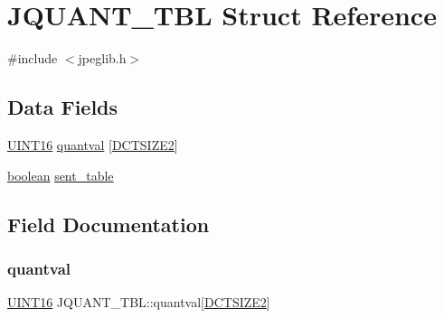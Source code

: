 \hypertarget{struct_j_q_u_a_n_t___t_b_l}{}\section{J\+Q\+U\+A\+N\+T\+\_\+\+T\+BL Struct Reference}
\label{struct_j_q_u_a_n_t___t_b_l}


{\ttfamily \#include $<$jpeglib.\+h$>$}

\subsection*{Data Fields}
\begin{DoxyCompactItemize}
\item 
\hyperlink{jmorecfg_8h_a805c2c164bdd38d72a30c46e84fb568b}{U\+I\+N\+T16} \hyperlink{struct_j_q_u_a_n_t___t_b_l_ab5b5150e73282a62ca7dc0f7e2fac944}{quantval} \mbox{[}\hyperlink{jpeglib_8h_af89dff4200396563157d4a1e59da3bdf}{D\+C\+T\+S\+I\+Z\+E2}\mbox{]}
\item 
\hyperlink{jconfig_8h_a7670a4e8a07d9ebb00411948b0bbf86d}{boolean} \hyperlink{struct_j_q_u_a_n_t___t_b_l_a218b782157eccfbd22023ae6bb4cc7fa}{sent\+\_\+table}
\end{DoxyCompactItemize}


\subsection{Field Documentation}
\mbox{\label{struct_j_q_u_a_n_t___t_b_l_ab5b5150e73282a62ca7dc0f7e2fac944}} 
\subsubsection{\texorpdfstring{quantval}{quantval}}
{\footnotesize\ttfamily \hyperlink{jmorecfg_8h_a805c2c164bdd38d72a30c46e84fb568b}{U\+I\+N\+T16} J\+Q\+U\+A\+N\+T\+\_\+\+T\+B\+L\+::quantval\mbox{[}\hyperlink{jpeglib_8h_af89dff4200396563157d4a1e59da3bdf}{D\+C\+T\+S\+I\+Z\+E2}\mbox{]}}

\mbox{\label{struct_j_q_u_a_n_t___t_b_l_a218b782157eccfbd22023ae6bb4cc7fa}} 
